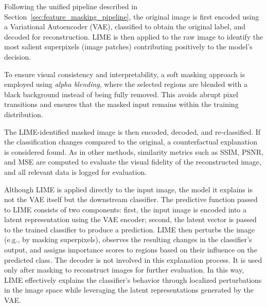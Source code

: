 Following the unified pipeline described in Section~\ref{sec:feature_masking_pipeline}, the original image is first encoded using a Variational Autoencoder (VAE), classified to obtain the original label, and decoded for reconstruction. LIME is then applied to the raw image to identify the most salient superpixels (image patches) contributing positively to the model's decision.

To ensure visual consistency and interpretability, a soft masking approach is employed using \textit{alpha blending}, where the selected regions are blended with a black background instead of being fully removed. This avoids abrupt pixel transitions and ensures that the masked input remains within the training distribution.

The LIME-identified masked image is then encoded, decoded, and re-classified. If the classification changes compared to the original, a counterfactual explanation is considered found. As in other methods, similarity metrics such as SSIM, PSNR, and MSE are computed to evaluate the visual fidelity of the reconstructed image, and all relevant data is logged for evaluation.


Although LIME is applied directly to the input image, the model it explains is not the VAE itself but the downstream classifier. The predictive function passed to LIME consists of two components: first, the input image is encoded into a latent representation using the VAE encoder; second, the latent vector is passed to the trained classifier to produce a prediction. LIME then perturbs the image (e.g., by masking superpixels), observes the resulting changes in the classifier's output, and assigns importance scores to regions based on their influence on the predicted class. The decoder is not involved in this explanation process. It is used only after masking to reconstruct images for further evaluation. In this way, LIME effectively explains the classifier's behavior through localized perturbations in the image space while leveraging the latent representations generated by the VAE.

